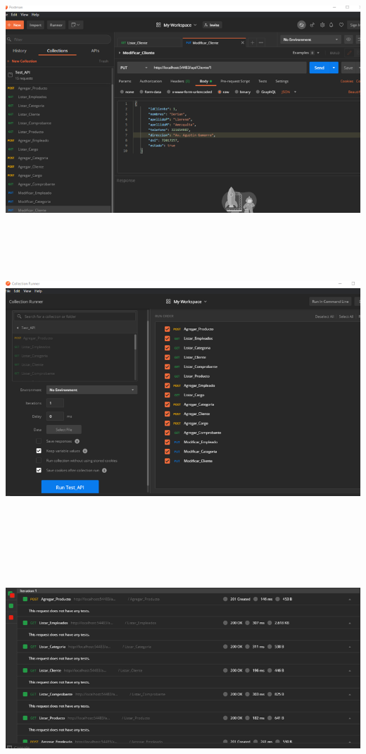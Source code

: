 \documentclass[12pt,letterpaper]{article}
\begin{document}
\begin{center}
    \includegraphics[width=18cm, height=10cm]{img/api1.png}  
\end{center}
\begin{center}
    \includegraphics[width=18cm, height=10cm]{img/api2.png}  
\end{center}
\begin{center}
    \includegraphics[width=18cm, height=10cm]{img/api3.png}  
\end{center}
\end{document}
